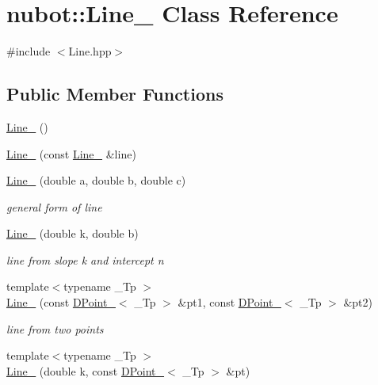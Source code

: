 \hypertarget{classnubot_1_1Line__}{\section{nubot\-:\-:Line\-\_\- Class Reference}
\label{classnubot_1_1Line__}
}


{\ttfamily \#include $<$Line.\-hpp$>$}

\subsection*{Public Member Functions}
\begin{DoxyCompactItemize}
\item 
\hyperlink{classnubot_1_1Line___af1cbf1f7e8d5f398bfa04636ab84ff4d}{Line\-\_\-} ()
\item 
\hyperlink{classnubot_1_1Line___a42dae13f70c2c713bb6a8e1c294b36e5}{Line\-\_\-} (const \hyperlink{classnubot_1_1Line__}{Line\-\_\-} \&line)
\item 
\hyperlink{classnubot_1_1Line___a53cffb2a64d15a9a3abee89ef16f099a}{Line\-\_\-} (double a, double b, double c)
\begin{DoxyCompactList}\small\item\em general form of line \end{DoxyCompactList}\item 
\hyperlink{classnubot_1_1Line___ab8872471a644ac3124ec5046843513a1}{Line\-\_\-} (double k, double b)
\begin{DoxyCompactList}\small\item\em line from slope k and intercept n \end{DoxyCompactList}\item 
{\footnotesize template$<$typename \-\_\-\-Tp $>$ }\\\hyperlink{classnubot_1_1Line___ad039d75b78c9c4b47da641b96e581ccf}{Line\-\_\-} (const \hyperlink{classnubot_1_1DPoint__}{D\-Point\-\_\-}$<$ \-\_\-\-Tp $>$ \&pt1, const \hyperlink{classnubot_1_1DPoint__}{D\-Point\-\_\-}$<$ \-\_\-\-Tp $>$ \&pt2)
\begin{DoxyCompactList}\small\item\em line from two points \end{DoxyCompactList}\item 
{\footnotesize template$<$typename \-\_\-\-Tp $>$ }\\\hyperlink{classnubot_1_1Line___a98c59bbad204ed81dfb7575e1dde42b6}{Line\-\_\-} (double k, const \hyperlink{classnubot_1_1DPoint__}{D\-Point\-\_\-}$<$ \-\_\-\-Tp $>$ \&pt)

\end{DoxyCompactItemize}
